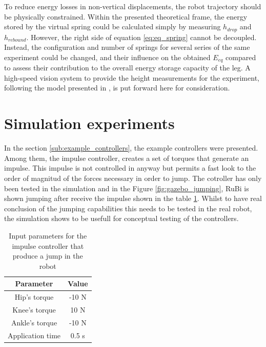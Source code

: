To reduce energy losses in non-vertical displacements, the robot trajectory should be physically constrained.
Within the presented theoretical frame, the energy stored by the virtual spring could be calculated simply by measuring $h_{drop}$ and $h_{rebound}$.
However, the right side of equation \ref{eq:eq_spring} cannot be decoupled.
Instead, the configuration and number of springs for several series of the same experiment could be changed, and their influence on the obtained $E_{eq}$ compared to assess their contribution to the overall energy storage capacity of the leg.
A high-speed vision system to provide the height measurements for the experiment, following the model presented in \cite{hs_vision}, is put forward here for consideration. 


\section{Simulation experiments} %
\label{sec:simulation_experiments}
In the section \ref{sub:example_controllers}, the example controllers were presented.
Among them, the impulse controller, creates a set of torques that generate an impulse.
This impulse is not controlled in anyway but permits a fast look to the order of magnitud of the forces necessary in order to jump.
The cotroller has only been tested in the simulation and in the Figure \ref{fig:gazebo_jumping}, RuBi is shown jumping after receive the impulse shown in the table \ref{tab:impulse_controller_inputs}. 
Whilst to have real conclusion of the jumping capabilities this needs to be tested in the real robot, the simulation shows to be usefull for conceptual testing of the controllers.

\begin{table}[tb]
    \caption{Input parameters for the impulse controller that produce a jump in the robot}
    \label{tab:impulse_controller_inputs}
    \centering

    \begin{tabular}{c|c}
    \textbf{Parameter} & \textbf{Value} \\
    \hline
        Hip's torque & -10 N \\
    \hline
        Knee's torque & 10 N \\
    \hline
        Ankle's torque & -10 N \\
    \hline
        Application time & 0.5 s \\
    \end{tabular}
\end{table}


